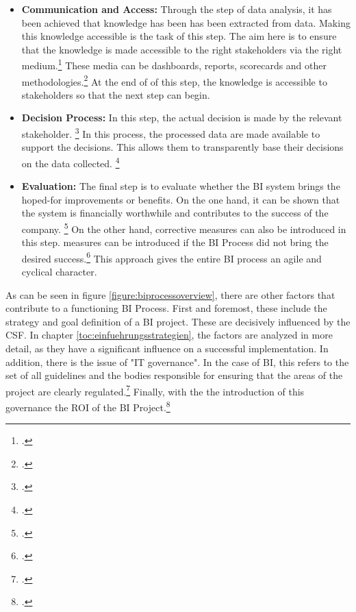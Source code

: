 \begin{itemize}
    decision-making processes.\footcite[Cf.][p. 94]{hovcevar2010assessing}
    \item \textbf{Communication and Access: }Through the step of data analysis, it has been achieved that knowledge has been
    has been extracted from data. Making this knowledge accessible is the task of this step. The aim here is to ensure that the knowledge
    is made accessible to the right stakeholders via the right medium.\footcite[Cf.][p. 11]{foley2010business} These
    media can be dashboards, reports, scorecards and other methodologies.\footcite[Cf.][pp. 21]{niu2009cognition} At the end of
    of this step, the knowledge is accessible to stakeholders so that the next step can begin.
    \item \textbf{Decision Process: }In this step, the actual decision is made by the relevant stakeholder.
    \footcite[Cf.][p. 12]{foley2010business} In this process, the processed data are made available to support the
    decisions. This allows them to transparently base their decisions on the data collected.
    \footcite[Cf.][p. 13]{kasemsap2016fundamentals}
    \item \textbf{Evaluation: }The final step is to evaluate whether the \ac{BI} system brings the hoped-for improvements or benefits.
    On the one hand, it can be shown that the system is financially worthwhile and contributes to the success of the company.
    \footcite[Cf.][p. 12]{foley2010business} On the other hand, corrective measures can also be introduced in this step.
    measures can be introduced if the \ac{BI} Process did not bring the desired success.\footcite[Cf.][p. 12]{foley2010business}
    This approach gives the entire \ac{BI} process an agile and cyclical character.
\end{itemize}

As can be seen in figure \ref{figure:biprocessoverview}, there are other factors that contribute to a functioning
\ac{BI} Process. First and foremost, these include the strategy and goal definition of a \ac{BI} project. These are decisively
influenced by the \ac{CSF}. In chapter \ref{toc:einfuehrungsstrategien}, the factors are analyzed in more detail, as they have a
significant influence on a successful implementation. In addition, there is the issue of "IT governance".
In the case of \ac{BI}, this refers to the set of all guidelines and the bodies responsible for ensuring that the
areas of the project are clearly regulated.\footcite[Cf.][p. 8]{foley2010business} Finally, with the
the introduction of this governance the \ac{ROI} of the \ac{BI} Project.\footcite[Cf.][p. 8]{foley2010business}

